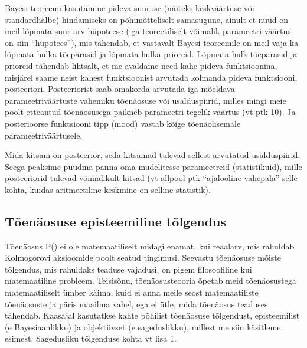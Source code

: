 \documentclass[]{book}
\begin{document}
Bayesi teoreemi kasutamine pideva suuruse (näiteks keskväärtuse või
standardhälbe) hindamiseks on põhimõtteliselt samasugune, ainult et nüüd
on meil lõpmata suur arv hüpoteese (iga teoreetiliselt võimalik
parameetri väärtus on siin ``hüpotees''), mis tähendab, et vastavalt
Bayesi teoreemile on meil vaja ka lõpmata hulka tõepärasid ja lõpmata
hulka prioreid. Lõpmata hulk tõepärasid ja prioreid tähendab lihtsalt,
et me avaldame need kahe pideva funktsioonina, misjärel saame neist
kahest funktsioonist arvutada kolmanda pideva funktsiooni, posteeriori.
Posteeriorist saab omakorda arvutada iga mõeldava parameetriväärtuste
vahemiku tõenäosuse või usalduspiirid, milles mingi meie poolt etteantud
tõenäosusega paikneb parameetri tegelik väärtus (vt ptk 10). Ja
posterioorse funktsiooni tipp (mood) vastab kõige tõenäolisemale
parameetriväärtusele.

Mida kitsam on posteerior, seda kitsamad tulevad sellest arvutatud
usalduspiirid. Seega peaksime püüdma panna oma mudelitesse parameetreid
(statistikuid), mille posteeriorid tulevad võimalikult kitsad (vt
allpool ptk ``ajalooline vahepala'' selle kohta, kuidas aritmeetiline
keskmine on selline statistik).

\subsection*{Tõenäosuse episteemiline
tõlgendus}\label{toenaosuse-episteemiline-tolgendus}

Tõenäosus P() ei ole matemaatiliselt midagi enamat, kui reaalarv, mis
rahuldab Kolmogorovi aksioomide poolt seatud tingimusi. Seevastu
tõenäosuse mõiste tõlgendus, mis rahuldaks teaduse vajadusi, on pigem
filosoofiline kui matemaatiline probleem. Teisisõnu, tõenäosusteooria
õpetab meid tõenäosustega matemaatiliselt ümber käima, kuid ei anna
meile seost matemaatiliste tõenäosuste ja päris maailma vahel, ega ei
ütle, mida tõenäosus teaduses tähendab. Kaasajal kasutatkse kahte
põhilist tõenäosuse tõlgendust, episteemilist (e Bayesiaanlikku) ja
objektiivset (e sageduslikku), millest me siin käsitleme esimest.
Sagedusliku tõlgenduse kohta vt lisa 1.
\end{document}
